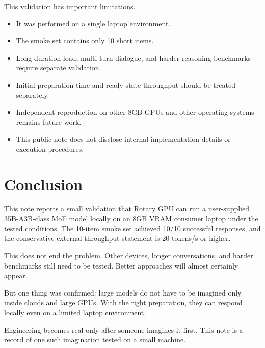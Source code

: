 \documentclass[11pt]{article}
\begin{document}
This validation has important limitations.

\begin{itemize}[leftmargin=1.5em]
  \item It was performed on a single laptop environment.
  \item The smoke set contains only 10 short items.
  \item Long-duration load, multi-turn dialogue, and harder reasoning benchmarks require separate validation.
  \item Initial preparation time and ready-state throughput should be treated separately.
  \item Independent reproduction on other 8GB GPUs and other operating systems remains future work.
  \item This public note does not disclose internal implementation details or execution procedures.
\end{itemize}

\section{Conclusion}

This note reports a small validation that Rotary GPU can run a user-supplied 35B-A3B-class MoE model locally on an 8GB VRAM consumer laptop under the tested conditions. The 10-item smoke set achieved 10/10 successful responses, and the conservative external throughput statement is 20 tokens/s or higher.

This does not end the problem. Other devices, longer conversations, and harder benchmarks still need to be tested. Better approaches will almost certainly appear.

But one thing was confirmed: large models do not have to be imagined only inside clouds and large GPUs. With the right preparation, they can respond locally even on a limited laptop environment.

Engineering becomes real only after someone imagines it first. This note is a record of one such imagination tested on a small machine.
\end{document}
